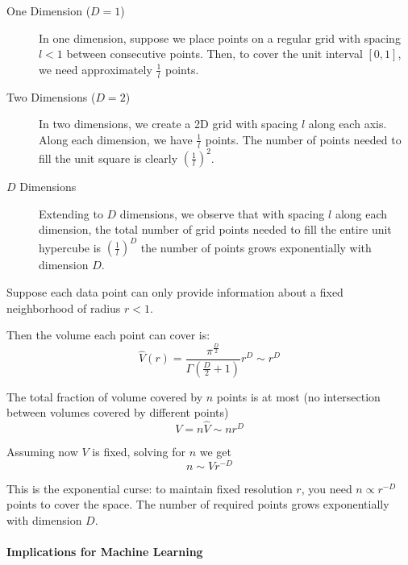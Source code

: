 \begin{description}
\item[One Dimension ($D=1$)] In one dimension, suppose we place points on a regular grid with spacing $l<1$ between consecutive points. Then, to cover the unit interval $[0,1]$, we need approximately $\frac{1}{l}$ points.%

\item[Two Dimensions ($D=2$)] In two dimensions, we create a 2D grid with spacing $l$ along each axis. Along each dimension, we have $\frac{1}{l}$ points. The number of points needed to fill the unit square is clearly $\left(\frac{1}{l}\right)^2$.%

\item[$D$ Dimensions] Extending to $D$ dimensions, we observe that with spacing $l$ along each dimension, the total number of grid points needed to fill the entire unit hypercube is
$\left(\frac{1}{l}\right)^D
$
the number of points grows exponentially with dimension $D$.
\end{description}

Suppose each data point can only provide information about a fixed neighborhood of radius $r<1$.

Then the volume each point can cover is:
$$
\hat V(r) = \frac{\pi^{\frac{D}{2}}}{\Gamma(\frac{D}{2}+1)}r^D\sim r^D
$$

The total fraction of volume covered by $n$ points is at most (no intersection between volumes covered by different points)
$$
V = n \hat V \sim n  r^D
$$

Assuming now $V$ is fixed, solving for $n$ we get
$$
n \sim Vr^{-D}
$$

This is the exponential curse: to maintain fixed resolution $r$, you need $n \propto r^{-D}$ points to cover the space. The number of required points grows exponentially with dimension $D$.
\paragraph{Implications for Machine Learning}

